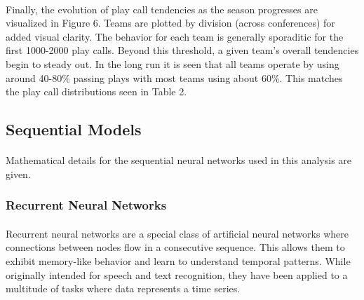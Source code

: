 \documentclass[11pt]{article}
\begin{document}
                    \begin{multicols*}{2}

                \paragraph{}
                    Finally, the evolution of play call tendencies as the season progresses are visualized in Figure 6. 
                    Teams are plotted by division (across conferences) for added visual clarity.
                    The behavior for each team is generally sporaditic for the first 1000-2000 play calls. 
                    Beyond this threshold, a given team's overall tendencies begin to steady out. 
                    In the long run it is seen that all teams operate by using around 40-80\% passing plays with most teams using about 60\%. 
                    This matches the play call distributions seen in Table 2.
                    
        
        \subsection{Sequential Models}
            \paragraph{}
                Mathematical details for the sequential neural networks used in this analysis are given. 

            \vspace{-5pt}

            \subsubsection*{Recurrent Neural Networks}
                \paragraph{}
                    Recurrent neural networks are a special class of artificial neural networks where connections between nodes flow in a consecutive sequence. 
                    This allows them to exhibit memory-like behavior and learn to understand temporal patterns. 
                    While originally intended for speech and text recognition, they have been applied to a multitude of tasks where data represents a time series.
                
                \vspace{-10pt}


\end{multicols*}
\end{document}
